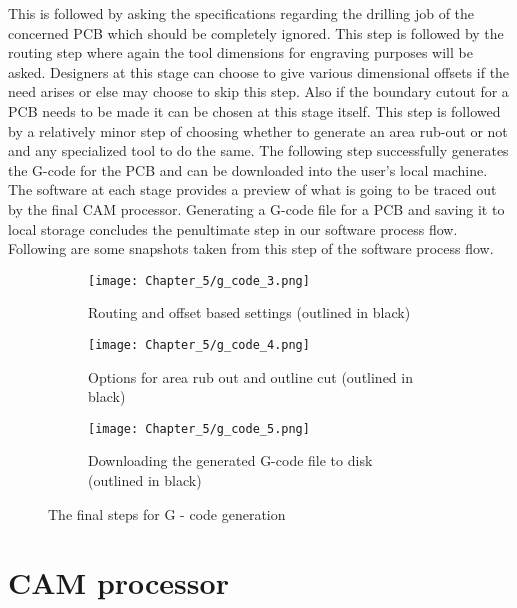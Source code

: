 This is followed by asking the specifications regarding the drilling job of the concerned PCB which should be completely ignored. This step is followed by the routing step where again the tool dimensions for engraving purposes will be asked. Designers at this stage can choose to give various dimensional offsets if the need arises or else may choose to skip this step. Also if the boundary cutout for a PCB needs to be made it can be chosen at this stage itself. This step is followed by a relatively minor step of choosing whether to generate an area rub-out or not and any specialized tool to do the same. The following step successfully generates the G-code for the PCB and can be downloaded into the user’s local machine. The software at each stage provides a preview of what is going to be traced out by the final CAM processor. Generating a G-code file for a PCB and saving it to local storage concludes the penultimate step in our software process flow. Following are some snapshots taken from this step of the software process flow. \par

\begin{figure}[h]
    \begin{subfigure}{0.5\textwidth}
    \texttt{[image: Chapter\_5/g\_code\_3.png]}
    \caption{Routing and offset based settings (outlined in black)}
    \label{fig:g3}
    \end{subfigure}
    \begin{subfigure}{0.5\textwidth}
    \texttt{[image: Chapter\_5/g\_code\_4.png]}
    \caption{Options for area rub out and outline cut (outlined in black)}
    \label{fig:g4}
    \end{subfigure}  
    \begin{center}
    \begin{subfigure}{0.5\textwidth}
    \texttt{[image: Chapter\_5/g\_code\_5.png]}
    \caption{Downloading the generated G-code file to disk (outlined in black)}
    \label{fig:g5}
    \end{subfigure} 
    \end{center}
    
    \caption{The final steps for G - code generation}
    \label{fig:g345}
\end{figure}

\section{CAM processor}

